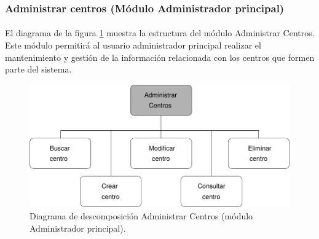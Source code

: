 \subsubsection{Administrar centros (Módulo Administrador principal)}

  \paragraph{}El diagrama de la figura
  \ref{diagramaDescomposicionAdministrarCentros} muestra la estructura del módulo
  Administrar Centros. Este módulo permitirá al usuario administrador principal
  realizar el mantenimiento y gestión de la información relacionada con los
  centros que formen parte del sistema.


  \begin{figure}[!ht]
    \begin{center}
      \includegraphics[]{11.Disenyo_Arquitectonico/11.2.Diagramas_Descomposicion/11.2.2.Modulo_administrador_principal/AdministrarBBDD/AdministrarCentros/Diagramas/administrar_centros.pdf}
      \caption{Diagrama de descomposición Administrar Centros (módulo Administrador principal).}
      \label{diagramaDescomposicionAdministrarCentros}
    \end{center}
  \end{figure}
